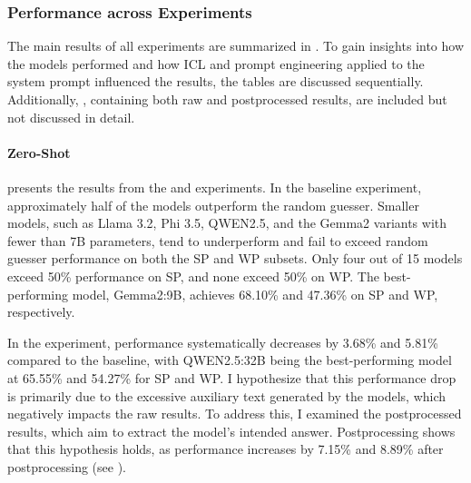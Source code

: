 \subsubsection{Performance across Experiments}
\label{sec:performance-across-experiments}

The main results of all experiments are summarized in . To gain insights into how the models performed and how \acf{ICL} and prompt engineering applied to the system prompt influenced the results, the tables are discussed sequentially. Additionally, , containing both raw and postprocessed results, are included but not discussed in detail.

\paragraph{Zero-Shot}
\label{par:zero-shot}

 presents the results from the  and  experiments. In the baseline experiment, approximately half of the models outperform the random guesser. Smaller models, such as Llama 3.2, Phi 3.5, QWEN2.5, and the Gemma2 variants with fewer than 7B parameters, tend to underperform and fail to exceed random guesser performance on both the \ac{SP} and \ac{WP} subsets. Only four out of 15 models exceed 50\% performance on \ac{SP}, and none exceed 50\% on \ac{WP}. The best-performing model, Gemma2:9B, achieves 68.10\% and 47.36\% on \ac{SP} and \ac{WP}, respectively.

In the  experiment, performance systematically decreases by 3.68\% and 5.81\% compared to the baseline, with QWEN2.5:32B being the best-performing model at 65.55\% and 54.27\% for \ac{SP} and \ac{WP}. I hypothesize that this performance drop is primarily due to the excessive auxiliary text generated by the models, which negatively impacts the raw results. To address this, I examined the postprocessed results, which aim to extract the model's intended answer. Postprocessing shows that this hypothesis holds, as performance increases by 7.15\% and 8.89\% after postprocessing (see ).

